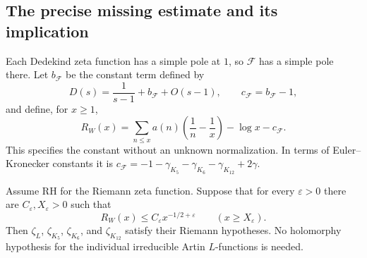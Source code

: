 \subsection{The precise missing estimate and its implication}

Each Dedekind zeta function has a simple pole at $1$, so $\mathcal F$ has a
simple pole there.  Let $b_{\mathcal F}$ be the constant term defined by
\[
 D(s)=\frac1{s-1}+b_{\mathcal F}+O(s-1),
 \qquad c_{\mathcal F}=b_{\mathcal F}-1,
\]
and define, for $x\geq1$,
\begin{equation}
 R_W(x)=\sum_{n\leq x}a(n)\left(\frac1n-\frac1x\right)
           -\log x-c_{\mathcal F}.
 \label{eq:a5-remainder}
\end{equation}
This specifies the constant without an unknown normalization.  In terms of
Euler--Kronecker constants it is
$c_{\mathcal F}=-1-\gamma_{K_5}-\gamma_{K_6}-\gamma_{K_{12}}+2\gamma$.

\begin{theorem}
\label{thm:a5-criterion}
Assume RH for the Riemann zeta function.  Suppose that for every
$\varepsilon>0$ there are $C_\varepsilon,X_\varepsilon>0$ such that
\begin{equation}
 R_W(x)\leq C_\varepsilon x^{-1/2+\varepsilon}
 \qquad(x\geq X_\varepsilon).
 \tag{$A_5$-bound}\label{eq:a5-missing-bound}
\end{equation}
Then $\zeta_L$, $\zeta_{K_5}$, $\zeta_{K_6}$, and $\zeta_{K_{12}}$ satisfy
their Riemann hypotheses.  No holomorphy hypothesis for the individual
irreducible Artin $L$-functions is needed.
\end{theorem}

